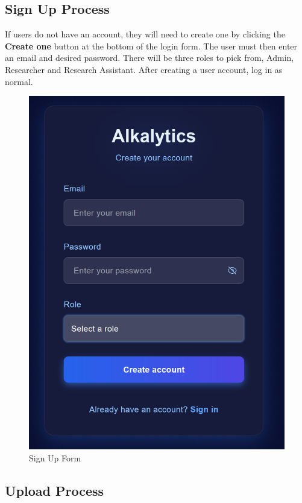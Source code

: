 \documentclass[12pt]{article}
\begin{document}
\subsection{Sign Up Process}
If users do not have an account, they will need to create one by clicking the
\textbf{Create one} button at the bottom of the login form. The user must then
enter an email and desired password. There will be three roles to pick from,
Admin, Researcher and Research Assistant. After creating a user account, log in
as normal. 
\begin{figure}[H]
    \centering
    \includegraphics[scale=0.55]{Images/sign up .png}
    \caption{Sign Up Form}
    \label{fig:example}
\end{figure}

\subsection{Upload Process}
\end{document}
